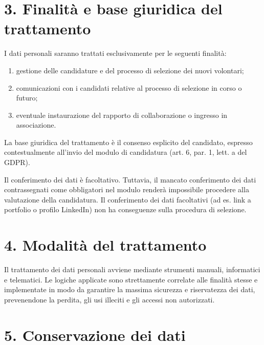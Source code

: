 \documentclass[11pt, a4paper]{article}
\begin{document}
\section*{3. Finalità e base giuridica del trattamento}

I dati personali saranno trattati esclusivamente per le seguenti finalità:
\begin{enumerate}
    \item gestione delle candidature e del processo di selezione dei nuovi volontari;
    \item comunicazioni con i candidati relative al processo di selezione in corso o futuro;
    \item eventuale instaurazione del rapporto di collaborazione o ingresso in associazione.
\end{enumerate}
La base giuridica del trattamento è il consenso esplicito del candidato, espresso contestualmente all'invio del modulo di candidatura (art. 6, par. 1, lett. a del GDPR).

Il conferimento dei dati è facoltativo. Tuttavia, il mancato conferimento dei dati contrassegnati come obbligatori nel modulo renderà impossibile procedere alla valutazione della candidatura. Il conferimento dei dati facoltativi (ad es. link a portfolio o profilo LinkedIn) non ha conseguenze sulla procedura di selezione.

\section*{4. Modalità del trattamento}

Il trattamento dei dati personali avviene mediante strumenti manuali, informatici e telematici. Le logiche applicate sono strettamente correlate alle finalità stesse e implementate in modo da garantire la massima sicurezza e riservatezza dei dati, prevenendone la perdita, gli usi illeciti e gli accessi non autorizzati.

\section*{5. Conservazione dei dati}
\end{document}
